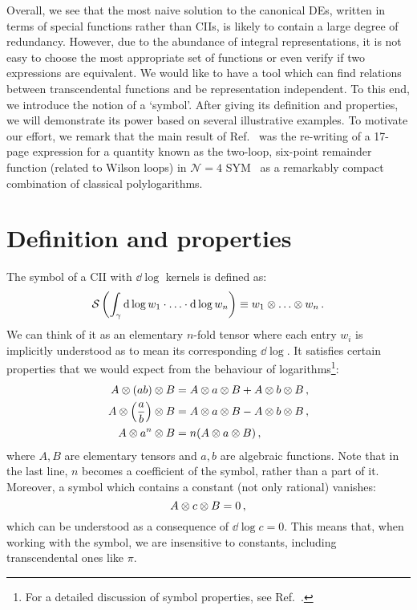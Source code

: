 \documentclass[main.tex]{subfiles}
\begin{document}
Overall, we see that the most naive solution to the canonical DEs, written in terms of special functions rather than CIIs, is likely to contain a large degree of redundancy. However, due to the abundance of integral representations, it is not easy to choose the most appropriate set of functions or even verify if two expressions are equivalent. We would like to have a tool which can find relations between transcendental functions and be representation independent. To this end, we introduce the notion of a `symbol'\cite{Goncharov:2010jf, Duhr:2011zq}. After giving its definition and properties, we will demonstrate its power based on several illustrative examples. To motivate our effort, we remark that the main result of Ref.~\cite{Goncharov:2010jf} was the re-writing of a 17-page expression for a quantity known as the two-loop, six-point remainder function (related to Wilson loops) in $\mathcal{N}=4$ SYM~\cite{DelDuca:2009au, DelDuca:2010zg} as a remarkably compact combination of classical polylogarithms.
\section{Definition and properties}
The symbol of a CII with $\dd \log$ kernels is defined as:
\begin{equation} \label{eq:symboldef}
    \mathcal{S} \left(\int_\gamma \mathrm{d} \log w_1 \cdot \ldots \cdot \mathrm{d} \log w_n \right) \equiv w_1 \otimes \ldots \otimes w_n \,.
\end{equation}
We can think of it as an elementary $n$-fold tensor where each entry $w_i$ is implicitly understood as to mean its corresponding $\dd \log$. It satisfies certain properties that we would expect from the behaviour of logarithms\footnote{For a detailed discussion of symbol properties, see Ref.~\cite{Duhr:2011zq}.}:
\begin{subequations}
\begin{align} \label{eq:symbolproperties}
    A \otimes (ab) \otimes B &= A \otimes a \otimes B + A \otimes b \otimes B\,, \\
    A \otimes \left(\frac{a}{b}\right) \otimes B &= A \otimes a \otimes B - A \otimes b \otimes B\,, \\
    A \otimes a^n \otimes B &= n(A \otimes a \otimes B)\,,
\end{align}
\end{subequations}
where $A, B$ are elementary tensors and $a, b$ are algebraic functions. Note that in the last line, $n$ becomes a coefficient of the symbol, rather than a part of it. Moreover, a symbol which contains a constant (not only rational) vanishes:
\begin{equation} \label{eq:symbolAcB}
    A \otimes c \otimes B = 0\,,
\end{equation}
which can be understood as a consequence of $\dd \log c = 0$. This means that, when working with the symbol, we are insensitive to constants, including transcendental ones like $\pi$. 
\end{document}
